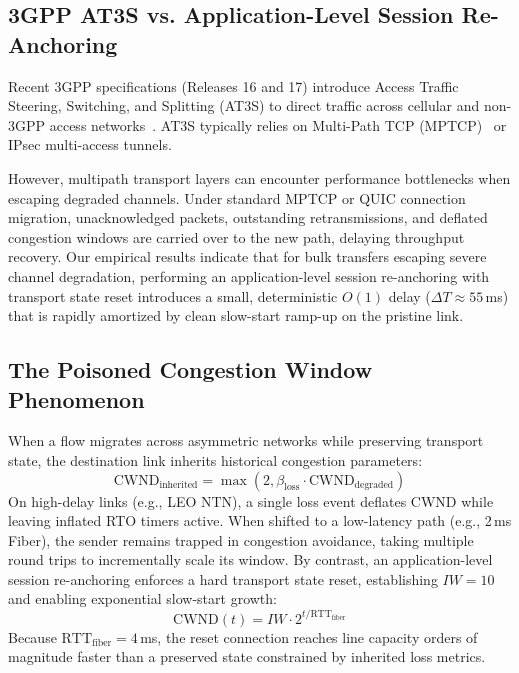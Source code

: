 \documentclass[conference]{IEEEtran}
\begin{document}
\subsection{3GPP AT3S vs. Application-Level Session Re-Anchoring}
Recent 3GPP specifications (Releases 16 and 17) introduce Access Traffic Steering, Switching, and Splitting (AT3S) to direct traffic across cellular and non-3GPP access networks~\cite{3gpp_at3s_rel16}. AT3S typically relies on Multi-Path TCP (MPTCP)~\cite{rfc8684_mptcp} or IPsec multi-access tunnels.

However, multipath transport layers can encounter performance bottlenecks when escaping degraded channels. Under standard MPTCP or QUIC connection migration, unacknowledged packets, outstanding retransmissions, and deflated congestion windows are carried over to the new path, delaying throughput recovery. Our empirical results indicate that for bulk transfers escaping severe channel degradation, performing an application-level session re-anchoring with transport state reset introduces a small, deterministic $O(1)$ delay ($\Delta T \approx 55$\,ms) that is rapidly amortized by clean slow-start ramp-up on the pristine link.

\subsection{The Poisoned Congestion Window Phenomenon}
When a flow migrates across asymmetric networks while preserving transport state, the destination link inherits historical congestion parameters:
\begin{equation}
\text{CWND}_{\text{inherited}} = \max\left(2, \beta_{\text{loss}} \cdot \text{CWND}_{\text{degraded}}\right)
\end{equation}
On high-delay links (e.g., LEO NTN), a single loss event deflates CWND while leaving inflated RTO timers active. When shifted to a low-latency path (e.g., 2\,ms Fiber), the sender remains trapped in congestion avoidance, taking multiple round trips to incrementally scale its window. By contrast, an application-level session re-anchoring enforces a hard transport state reset, establishing $IW = 10$ and enabling exponential slow-start growth:
\begin{equation}
\text{CWND}(t) = IW \cdot 2^{t / \text{RTT}_{\text{fiber}}}
\end{equation}
Because $\text{RTT}_{\text{fiber}} = 4$\,ms, the reset connection reaches line capacity orders of magnitude faster than a preserved state constrained by inherited loss metrics.
\end{document}

